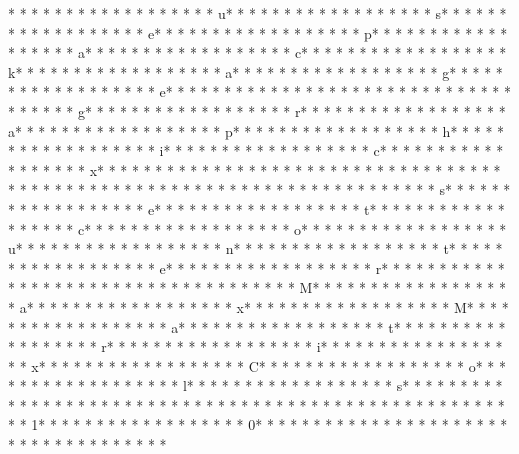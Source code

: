* * *  * * *  * * *  *  * * *  *  * * *  * u* * *  * * *  * * *  *  * * *  *  * * *  * s* * *  * * *  * * *  *  * * *  *  * * *  * e* * *  * * *  * * *  *  * * *  *  * * *  * p* * *  * * *  * * *  *  * * *  *  * * *  * a* * *  * * *  * * *  *  * * *  *  * * *  * c* * *  * * *  * * *  *  * * *  *  * * *  * k* * *  * * *  * * *  *  * * *  *  * * *  * a* * *  * * *  * * *  *  * * *  *  * * *  * g* * *  * * *  * * *  *  * * *  *  * * *  * e* * *  * * *  * * *  *  * * *  *  * * *  * {* * *  * * *  * * *  *  * * *  *  * * *  * g* * *  * * *  * * *  *  * * *  *  * * *  * r* * *  * * *  * * *  *  * * *  *  * * *  * a* * *  * * *  * * *  *  * * *  *  * * *  * p* * *  * * *  * * *  *  * * *  *  * * *  * h* * *  * * *  * * *  *  * * *  *  * * *  * i* * *  * * *  * * *  *  * * *  *  * * *  * c* * *  * * *  * * *  *  * * *  *  * * *  * x* * *  * * *  * * *  *  * * *  *  * * *  * }* * *  * * *  * * *  *  * * *  *  * * *  * 
* * *  * * *  * * *  *  * * *  *  * * *  * 
* * *  * * *  * * *  *  * * *  *  * * *  * s* * *  * * *  * * *  *  * * *  *  * * *  * e* * *  * * *  * * *  *  * * *  *  * * *  * t* * *  * * *  * * *  *  * * *  *  * * *  * c* * *  * * *  * * *  *  * * *  *  * * *  * o* * *  * * *  * * *  *  * * *  *  * * *  * u* * *  * * *  * * *  *  * * *  *  * * *  * n* * *  * * *  * * *  *  * * *  *  * * *  * t* * *  * * *  * * *  *  * * *  *  * * *  * e* * *  * * *  * * *  *  * * *  *  * * *  * r* * *  * * *  * * *  *  * * *  *  * * *  * {* * *  * * *  * * *  *  * * *  *  * * *  * M* * *  * * *  * * *  *  * * *  *  * * *  * a* * *  * * *  * * *  *  * * *  *  * * *  * x* * *  * * *  * * *  *  * * *  *  * * *  * M* * *  * * *  * * *  *  * * *  *  * * *  * a* * *  * * *  * * *  *  * * *  *  * * *  * t* * *  * * *  * * *  *  * * *  *  * * *  * r* * *  * * *  * * *  *  * * *  *  * * *  * i* * *  * * *  * * *  *  * * *  *  * * *  * x* * *  * * *  * * *  *  * * *  *  * * *  * C* * *  * * *  * * *  *  * * *  *  * * *  * o* * *  * * *  * * *  *  * * *  *  * * *  * l* * *  * * *  * * *  *  * * *  *  * * *  * s* * *  * * *  * * *  *  * * *  *  * * *  * }* * *  * * *  * * *  *  * * *  *  * * *  * {* * *  * * *  * * *  *  * * *  *  * * *  * 1* * *  * * *  * * *  *  * * *  *  * * *  * 0* * *  * * *  * * *  *  * * *  *  * * *  * }* * *  * * *  * * *  *  * * *  *  * * *  * 
